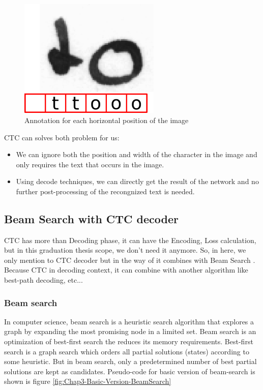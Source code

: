 \begin{figure}[H]
	\centering
	\includegraphics[width=0.6\textwidth]{img/Chap3/Annotation-image-CTC}
	\caption{ Annotation for each horizontal position of the image }
	\label{fig:Chap3-Annottion-image-CTC}
\end{figure}
CTC can solves both problem for us:
\begin{itemize}
	\item We can ignore both the position and width of the character in the image
	      and only requires the text that occurs in the image.
	\item Using decode techniques, we can directly get the result of the network and
	      no further post-processing of the recongnized text is needed. 
\end{itemize}

\subsection{ Beam Search with CTC decoder }
CTC has more than Decoding phase, it can have the Encoding, Loss calculation, but in
this graduation thesis scope, we don't need it anymore. So, in here, we only
mention to CTC decoder but in the way of it combines with Beam Search \cite{scheidl2018word}. Because CTC
in decoding context, it can combine with another algorithm like best-path decoding, etc...

\subsubsection{ Beam search }
In computer science, beam search \cite{BeamSearch} is a heuristic search algorithm that
explores a graph by expanding the most promising node in a limited set.
Beam search is an optimization of best-first search the reduces its memory
requirements. Best-first search is a graph search which orders all
partial solutions (states) according to some heuristic. But in beam search,
only a predetermined number of best partial solutions are kept as candidates.
Pseudo-code for basic version of beam-search is shown is figure \ref{fig:Chap3-Basic-Version-BeamSearch}

